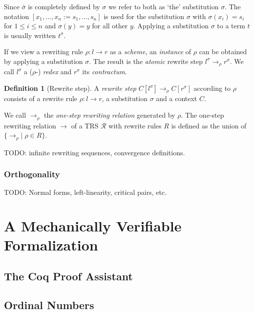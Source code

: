 \documentclass[11pt,oneside,a4paper,final]{report}
\theoremstyle{definition}
\newtheorem{definition}{Definition}
\begin{document}
Since $\bar{\sigma}$ is completely defined by $\sigma$ we refer to both as
`the' substitution $\sigma$. The notation $[x_1, \ldots, x_n := s_1, \ldots,
  s_n]$ is used for the substitution $\sigma$ with $\sigma(x_i) = s_i$ for $1
\leq i \leq n$ and $\sigma(y) = y$ for all other $y$. Applying a substitution
$\sigma$ to a term $t$ is usually written $t^\sigma$.

If we view a rewriting rule $\rho : l \rightarrow r$ as a \emph{scheme}, an
\emph{instance} of $\rho$ can be obtained by applying a substitution
$\sigma$. The result is the \emph{atomic} rewrite step $l^\sigma
\rightarrow_\rho r^\sigma$. We call $l^\sigma$ a ($\rho$-) \emph{redex} and
$r^\sigma$ its \emph{contractum}.

\begin{definition}[Rewrite step]
A \emph{rewrite step} $C[l^\sigma] \rightarrow_\rho C[r^\sigma]$ according to
$\rho$ consists of a rewrite rule $\rho : l \rightarrow r$, a substitution
$\sigma$ and a context $C$.
\end{definition}

We call $\rightarrow_\rho$ the \emph{one-step rewriting relation} generated by
$\rho$. The one-step rewriting relation $\rightarrow$ of a TRS $\mathcal{R}$
with rewrite rules $R$ is defined as the union of $\{ \rightarrow_\rho | \;
\rho \in R \}$.

TODO: infinite rewriting sequences, convergence definitions.


\subsection{Orthogonality}

TODO: Normal forms, left-linearity, critical pairs, etc.


\chapter{A Mechanically Verifiable Formalization}\label{chap:formalization}


\section{The Coq Proof Assistant}


\section{Ordinal Numbers}
\end{document}
